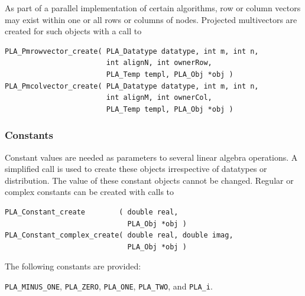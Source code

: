 As part of a parallel implementation of certain algorithms,
row or column vectors may exist within one or all rows or columns of nodes.
Projected multivectors are created for such objects with a call to
\begin{FlaSpec}
\begin{verbatim}
PLA_Pmrowvector_create( PLA_Datatype datatype, int m, int n,
                        int alignN, int ownerRow,
                        PLA_Temp templ, PLA_Obj *obj )
PLA_Pmcolvector_create( PLA_Datatype datatype, int m, int n,
                        int alignM, int ownerCol,
                        PLA_Temp templ, PLA_Obj *obj )
\end{verbatim}
\end{FlaSpec}

\subsubsection{Constants}

Constant values are needed as parameters to several linear algebra operations.
A simplified call is used to create these objects irrespective of datatypes
or distribution.  The value of these constant objects cannot be changed.
Regular or complex constants can be created with calls to
\begin{FlaSpec}
\begin{verbatim}
PLA_Constant_create        ( double real, 
                             PLA_Obj *obj )
PLA_Constant_complex_create( double real, double imag, 
                             PLA_Obj *obj )
\end{verbatim}
\end{FlaSpec}
The following constants are provided:
\begin{center}
{\tt PLA\_MINUS\_ONE}, {\tt PLA\_ZERO}, {\tt PLA\_ONE}, {\tt PLA\_TWO}, and {\tt PLA\_i}.
\end{center}


